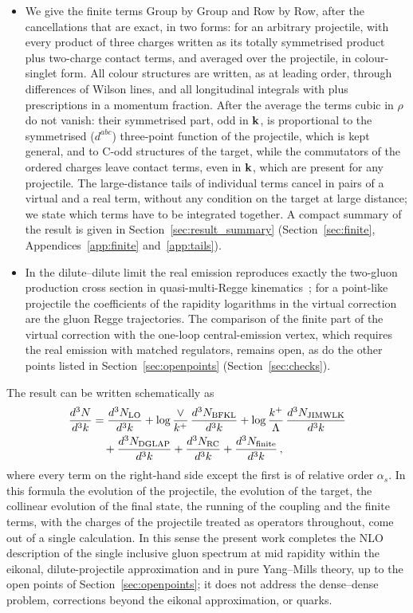 \begin{itemize}
\item We give the finite terms Group by Group and Row by Row, after the cancellations that are exact, in two forms: for an arbitrary projectile, with every product of three charges written as its totally symmetrised product plus two-charge contact terms, and averaged over the projectile, in colour-singlet form. All colour structures are written, as at leading order, through differences of Wilson lines, and all longitudinal integrals with plus prescriptions in a momentum fraction. After the average the terms cubic in $\rho$ do not vanish: their symmetrised part, odd in $\mathbf{k}$, is proportional to the symmetrised ($d^{abc}$) three-point function of the projectile, which is kept general, and to C-odd structures of the target, while the commutators of the ordered charges leave contact terms, even in $\mathbf{k}$, which are present for any projectile. The large-distance tails of individual terms cancel in pairs of a virtual and a real term, without any condition on the target at large distance; we state which terms have to be integrated together. A compact summary of the result is given in Section~\ref{sec:result_summary} (Section~\ref{sec:finite}, Appendices~\ref{app:finite} and~\ref{app:tails}).
\item In the dilute--dilute limit the real emission reproduces exactly the two-gluon production cross section in quasi-multi-Regge kinematics~\cite{Fadin:1998py,Bartels:2006hg}; for a point-like projectile the coefficients of the rapidity logarithms in the virtual correction are the gluon Regge trajectories. The comparison of the finite part of the virtual correction with the one-loop central-emission vertex, which requires the real emission with matched regulators, remains open, as do the other points listed in Section~\ref{sec:openpoints} (Section~\ref{sec:checks}).
\end{itemize}
The result can be written schematically as
\begin{align}\label{eq:schematic}
\frac{d^3N}{d^3k} &= \frac{d^3N_{\rm LO}}{d^3k}
+ \log\frac{\vee}{k^+}\,\frac{d^3N_{\rm BFKL}}{d^3k}
+ \log\frac{k^+}{\Lambda}\,\frac{d^3N_{\rm JIMWLK}}{d^3k}\notag\\
&\quad+ \frac{d^3N_{\rm DGLAP}}{d^3k}
+ \frac{d^3N_{\rm RC}}{d^3k}
+ \frac{d^3N_{\rm finite}}{d^3k}\,,
\end{align}
where every term on the right-hand side except the first is of relative order $\alpha_s$. In this formula the evolution of the projectile, the evolution of the target, the collinear evolution of the final state, the running of the coupling and the finite terms, with the charges of the projectile treated as operators throughout, come out of a single calculation. In this sense the present work completes the NLO description of the single inclusive gluon spectrum at mid rapidity within the eikonal, dilute-projectile approximation and in pure Yang--Mills theory, up to the open points of Section~\ref{sec:openpoints}; it does not address the dense--dense problem, corrections beyond the eikonal approximation, or quarks.

